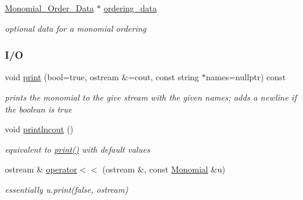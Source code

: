 \begin{DoxyCompactItemize}
\mbox{\label{group__polygroup_ae91138ece28b35404366c1a47e283034}} 
\hyperlink{group__orderinggroup_class_monomial___order___data}{Monomial\+\_\+\+Order\+\_\+\+Data} $\ast$ \hyperlink{group__polygroup_ae91138ece28b35404366c1a47e283034}{ordering\+\_\+data}
\begin{DoxyCompactList}\small\item\em optional data for a monomial ordering \end{DoxyCompactList}\end{DoxyCompactItemize}
\subsubsection*{I/O}
\begin{DoxyCompactItemize}
\item 
\mbox{\label{group__polygroup_ad428399071b7e7b63604d506b5dfdf93}} 
void \hyperlink{group__polygroup_ad428399071b7e7b63604d506b5dfdf93}{print} (bool=true, ostream \&=cout, const string $\ast$names=nullptr) const
\begin{DoxyCompactList}\small\item\em prints the monomial to the give stream with the given names; adds a newline if the boolean is true \end{DoxyCompactList}\item 
\mbox{\label{group__polygroup_a339f1927077ab6d92b050d222d945f72}} 
void \hyperlink{group__polygroup_a339f1927077ab6d92b050d222d945f72}{printlncout} ()
\begin{DoxyCompactList}\small\item\em equivalent to {\ttfamily \hyperlink{group__polygroup_ad428399071b7e7b63604d506b5dfdf93}{print()}} with default values \end{DoxyCompactList}\item 
\mbox{\label{group__polygroup_a76dc21e1d0624ecd913ce3e2f83c0f13}} 
ostream \& \hyperlink{group__polygroup_a76dc21e1d0624ecd913ce3e2f83c0f13}{operator$<$$<$} (ostream \&, const \hyperlink{group__polygroup_class_monomial}{Monomial} \&u)
\begin{DoxyCompactList}\small\item\em essentially {\ttfamily u.\+print(false, ostream)} \end{DoxyCompactList}\end{DoxyCompactItemize}


